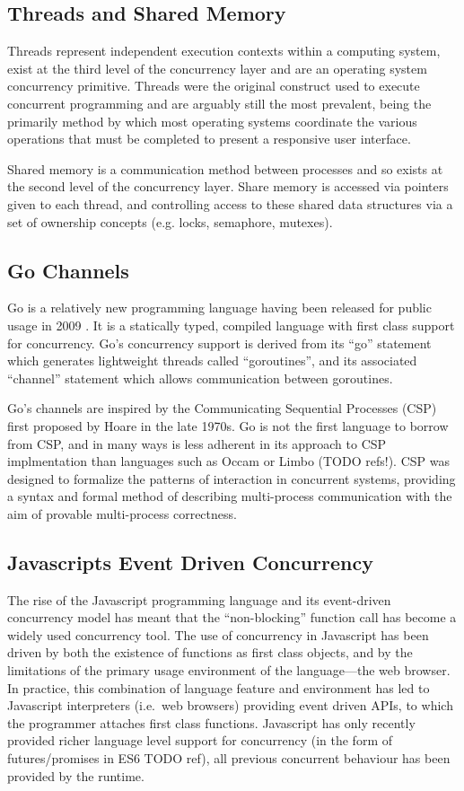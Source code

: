 \documentclass{sig-alternate}
\begin{document}
\subsection{Threads and Shared Memory}
Threads represent independent execution contexts within a computing
system, exist at the third level of the concurrency layer and are an
operating system concurrency primitive. Threads were the original
construct used to execute concurrent programming and are arguably
still the most prevalent, being the primarily method by which most
operating systems coordinate the various operations that must be
completed to present a responsive user interface.

Shared memory is a communication method between processes and so
exists at the second level of the concurrency layer. Share memory is
accessed via pointers given to each thread, and controlling access to
these shared data structures via a set of ownership concepts (e.g.
locks, semaphore, mutexes).

\subsection{Go Channels}
Go is a relatively new programming language having been released for
public usage in 2009 \cite{go:_frequen_asked_quest}. It is a
statically typed, compiled language with first class support for
concurrency. Go's concurrency support is derived from its ``go''
statement which generates lightweight threads called ``goroutines'',
and its associated ``channel'' statement which allows communication
between goroutines.

Go's channels are inspired by the Communicating Sequential Processes
(CSP) first proposed by Hoare in the late
1970s\cite{Hoare:1978:CSP:359576.359585}. Go is not the first language
to borrow from CSP, and in many ways is less adherent in its approach
to CSP implmentation than languages such as Occam or Limbo (TODO
refs!). CSP was designed to formalize the patterns of interaction in
concurrent systems, providing a syntax and formal method of describing
multi-process communication with the aim of provable multi-process
correctness.

\subsection{Javascripts Event Driven Concurrency}
The rise of the Javascript programming language and its event-driven
concurrency model has meant that the ``non-blocking'' function call
has become a widely used concurrency tool. The use of concurrency in
Javascript has been driven by both the existence of functions as first
class objects, and by the limitations of the primary usage environment
of the language---the web browser. In practice, this combination of
language feature and environment has led to Javascript interpreters
(i.e.~web browsers) providing event driven APIs, to which the
programmer attaches first class functions. Javascript has only
recently provided richer language level support for concurrency (in
the form of futures/promises in ES6 TODO ref), all previous concurrent
behaviour has been provided by the runtime.
\end{document}
